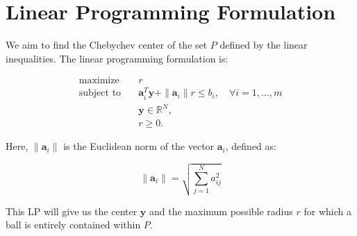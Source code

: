 \documentclass{article}
\begin{document}
\section*{Linear Programming Formulation}

We aim to find the Chebychev center of the set \( P \) defined by the linear inequalities. The linear programming formulation is:

\[
\begin{align*}
\text{maximize} \quad & r \\
\text{subject to} \quad & \mathbf{a}_i^T \mathbf{y} + \|\mathbf{a}_i\| r \leq b_i, \quad \forall i = 1, \ldots, m \\
& \mathbf{y} \in \mathbb{R}^N, \\
& r \geq 0.
\end{align*}
\]

Here, \( \|\mathbf{a}_i\| \) is the Euclidean norm of the vector \( \mathbf{a}_i \), defined as:

\[
\|\mathbf{a}_i\| = \sqrt{\sum_{j=1}^{N} a_{ij}^2}
\]

This LP will give us the center \( \mathbf{y} \) and the maximum possible radius \( r \) for which a ball is entirely contained within \( P \).
\end{document}
